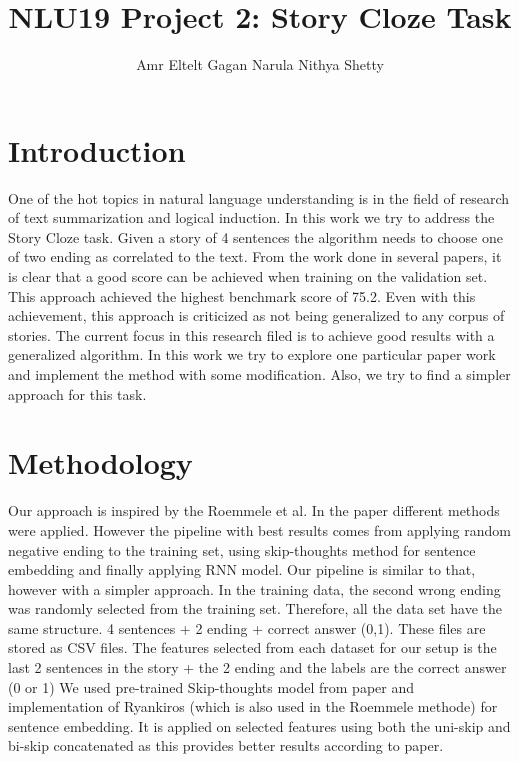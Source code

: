 \documentclass{article}
\title{NLU19 Project 2: Story Cloze Task}
\author{Amr Eltelt \qquad Gagan Narula \qquad Nithya Shetty}
\begin{document}

\maketitle



\section{Introduction}
One of the hot topics in natural language understanding is in the field of research of text summarization and logical induction. In this work we try to address the Story Cloze task. Given a story of 4 sentences the algorithm needs to choose one of two ending as correlated to the text.
From the work done in several papers, it is clear that a good score can be achieved when training on the validation set. This approach achieved the highest benchmark score of 75.2. Even with this achievement, this approach is criticized as not being generalized to any corpus of stories. The current focus in this research filed is to achieve good results with a generalized algorithm. In this work we try to explore one particular paper work and implement the method with some modification. Also, we try to find a simpler approach for this task.
\section{Methodology}
Our approach is inspired by the Roemmele et al. In the paper different methods were applied. However the pipeline with best results comes from applying random negative ending to the training set, using skip-thoughts method for sentence embedding and finally applying RNN model.
Our pipeline is similar to that, however with a simpler approach.
In the training data, the second wrong ending was randomly selected from the training set. Therefore, all the data set have the same structure. 4 sentences + 2 ending + correct answer (0,1). These files are stored as CSV files.
The features selected from each dataset for our setup is the last 2 sentences in the story + the 2 ending and the labels are the correct answer (0 or 1)
We used pre-trained Skip-thoughts model from paper and implementation of Ryankiros (which is also used in the Roemmele methode) for sentence embedding. It is applied on selected features using both the uni-skip and bi-skip concatenated as this provides better results according to paper. 
\end{document}
